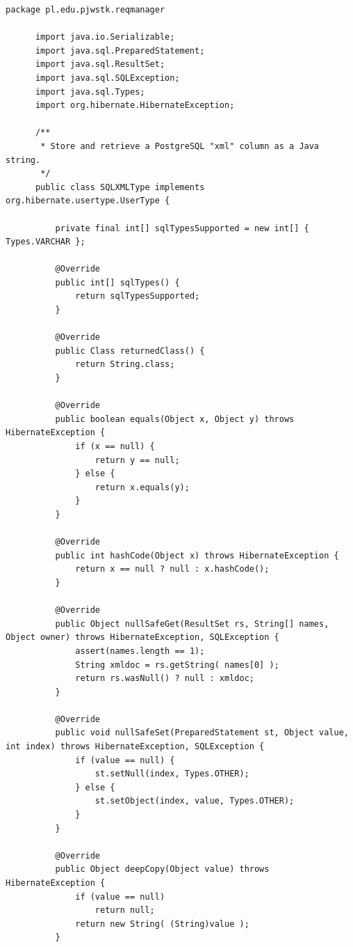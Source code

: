       \begin{lstlisting}[caption={implementacja niestandardowego typu SQLXMLType}, label={lst:xmlType}]
      package pl.edu.pjwstk.reqmanager
       
      import java.io.Serializable;
      import java.sql.PreparedStatement;
      import java.sql.ResultSet;
      import java.sql.SQLException;
      import java.sql.Types;
      import org.hibernate.HibernateException;
       
      /**
       * Store and retrieve a PostgreSQL "xml" column as a Java string.
       */
      public class SQLXMLType implements org.hibernate.usertype.UserType {
       
          private final int[] sqlTypesSupported = new int[] { Types.VARCHAR };
       
          @Override
          public int[] sqlTypes() {
              return sqlTypesSupported;
          }
       
          @Override
          public Class returnedClass() {
              return String.class;
          }
       
          @Override
          public boolean equals(Object x, Object y) throws HibernateException {
              if (x == null) {
                  return y == null;
              } else {
                  return x.equals(y);
              }
          }
       
          @Override
          public int hashCode(Object x) throws HibernateException {
              return x == null ? null : x.hashCode();
          }
       
          @Override
          public Object nullSafeGet(ResultSet rs, String[] names, Object owner) throws HibernateException, SQLException {
              assert(names.length == 1);
              String xmldoc = rs.getString( names[0] );
              return rs.wasNull() ? null : xmldoc;
          }
       
          @Override
          public void nullSafeSet(PreparedStatement st, Object value, int index) throws HibernateException, SQLException {
              if (value == null) {
                  st.setNull(index, Types.OTHER);
              } else {
                  st.setObject(index, value, Types.OTHER);
              }
          }
       
          @Override
          public Object deepCopy(Object value) throws HibernateException {
              if (value == null)
                  return null;
              return new String( (String)value );
          }
       

\end{lstlisting}
